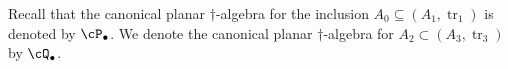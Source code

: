 \documentclass[11pt]{article}
\theoremstyle{plain}
\newtheorem{cor}[thm]{Corollary}
\theoremstyle{definition}
\DeclareMathOperator{\tr}{tr}
\newcommand{\set}[2]{\left\{#1 \middle| #2\right\}}
\newcommand{\nn}[1]{\textcolor{red}{[[#1]]}}
\newcommand{\roundNbox}[6]{
 \draw[rounded corners=5pt, very thick, #1] ($#2+(-#3,-#3)+(-#4,0)$) rectangle ($#2+(#3,#3)+(#5,0)$);
 \coordinate (ZZa) at ($#2+(-#4,0)$);
 \coordinate (ZZb) at ($#2+(#5,0)$);
 \node at ($1/2*(ZZa)+1/2*(ZZb)$) {#6};
}
\begin{document}
%
%
%

Recall that the canonical planar $\dag$-algebra for the inclusion $A_0 \subseteq (A_1,\tr_1)$ is denoted by $\cP_{\bullet}$.
We denote the canonical planar $\dag$-algebra for $A_2 \subset (A_3,\tr_3)$ by $\cQ_{\bullet}$.
\end{document}
